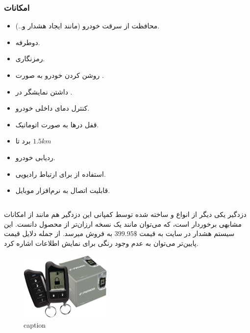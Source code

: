 \documentclass[a4paper,12pt]{report}
\begin{document}
	\subsubsection{
		امکانات
	}\label{subsubsec1:subsec1:sec3:chap1}
	\begin{itemize}[nosep]\label{item1:subsec1:sec3:chap1}
		\item
			محافظت از سرقت خودرو (مانند ایجاد هشدار و..).
		\item
			 دوطرفه.
		\item
			رمزنگاری.
		\item
			روشن کردن خودرو به صورت
			.
		\item
			داشتن نمایشگر
			در
			.
		\item
			کنترل دمای داخلی خودرو.
		\item
			قفل درها به صورت اتوماتیک.
		\item
			برد
				تا
			$1.5 km$
		\item
			ردیابی خودرو.
		\item
			استفاده از
			برای ارتباط رادیویی.
		\item
			قابلیت اتصال به نرم‌افزار موبایل.
	\end{itemize}

	\subsection{
	}\label{subsec2:sec3:chap1}

	دزدگیر
	یکی دیگر از انواع
	و  ساخته شده توسط کمپانی
	این دزدگیر هم مانند
	از امکانات مشابهی برخوردار است، که می‌توان مانند یک نسخه ارزان‌تر از محصول
	دانست. این سیستم هشدار در سایت
		به قیمت
	$399.95\$$
	به فروش میرسد. از جمله دلایل قیمت پایین‌تر می‌توان به عدم وجود
	رنگی برای نمایش اطلاعات اشاره کرد.
	\cite{PythonHo3:online}

	\begin{figure}[!h]
		\label{fig1:subsec2:sec3:chap1}
		\begin{center}
			\includegraphics[width=0.4\textwidth]{resources/Python_5760P.jpg}
			\caption{caption}
		\end{center}
	\end{figure}
\end{document}
